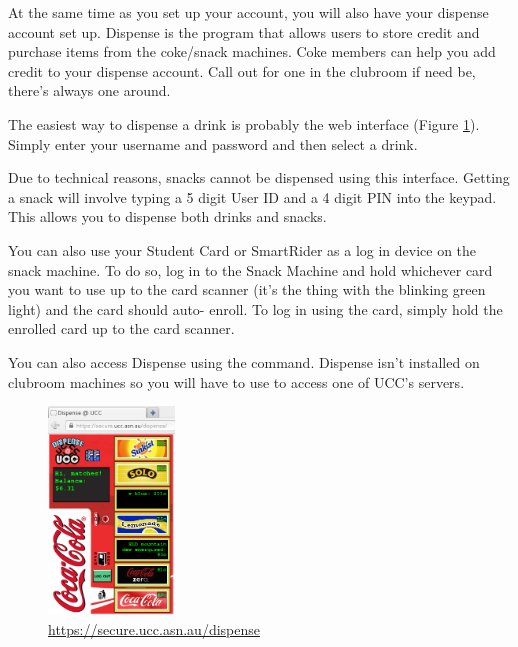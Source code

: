 

\begin{mdframed}
\null
At the same time as you set up your account, you will also have your dispense account set up. Dispense is the program that allows users to store credit and purchase items from the coke/snack machines. Coke members can help you add credit to your dispense account. Call out for one in the clubroom if need be, there's always one around.


The easiest way to dispense a drink is probably the web interface (Figure \ref{webdispense.png}). Simply enter your username and password and then select a drink. 

Due to technical reasons, snacks cannot be dispensed using this interface. Getting a snack will involve typing a 5 digit User ID and a 4 digit PIN into the keypad. This allows you to dispense both drinks and snacks.

You can also use your Student Card or SmartRider as a log in device on the snack machine. To do so, log in to the Snack Machine and hold whichever card you want to use up to the card scanner (it's the thing with the blinking green light) and the card should auto- enroll. To log in using the card, simply hold the enrolled card up to the card scanner.


You can also access Dispense using the  command. Dispense isn't installed on clubroom machines so you will have to use  to access one of UCC's servers.




\begin{figure}[H]
	\centering
	\includegraphics[width=0.3\textwidth]{figures/webdispense.png}
	\caption{\url{https://secure.ucc.asn.au/dispense}} 
	\label{webdispense.png}
\end{figure}
%
%
\end{mdframed}
